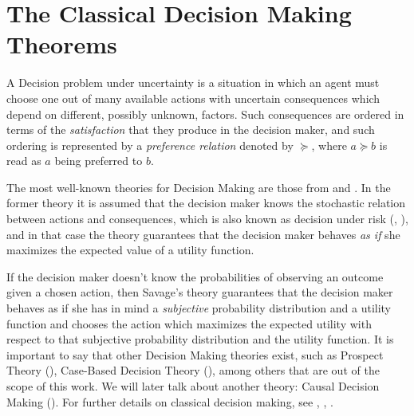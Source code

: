 \documentclass{article}
\theoremstyle{plain}
\begin{document}
\section{The Classical Decision Making Theorems}
A Decision problem under uncertainty is a situation in which an agent must choose one out of many available actions with uncertain consequences which depend on different, possibly unknown, factors. Such consequences are ordered in terms of the \textit{satisfaction} that they produce in the decision maker, and such ordering is represented by a \textit{preference relation} denoted by $\succeq$, where $a \succeq b$ is read as $a$ being preferred to $b$.

The most well-known theories for Decision Making are those from \cite{von1944theory} and \cite{savage1954the}. In the former theory it is assumed that the decision maker knows the stochastic relation between actions and consequences, which is also known as decision under risk (\cite{binmore2008rational}, \cite{peterson2017introduction}), and in that case the theory guarantees that the decision maker behaves \textit{as if} she maximizes the expected value of a utility function. 

If the decision maker doesn't know the probabilities of observing an outcome given a chosen action, then Savage's theory guarantees that the decision maker behaves as if she has in mind a \textit{subjective} probability distribution and a utility function and chooses the action which maximizes the expected utility with respect to that subjective probability distribution and the utility function. It is important to say that other Decision Making theories exist, such as Prospect Theory (\cite{kahneman1979prospect}), Case-Based Decision Theory (\cite{gilboa1995case}), among others that are out of the scope of this work. We will later talk about another theory: Causal Decision Making (\cite{joyce1999foundations}). For further details on classical decision making, see \cite{bernardo2000bayesian}, \cite{gilboa2009decision}, \cite{wakker2010prospect}.
\end{document}
